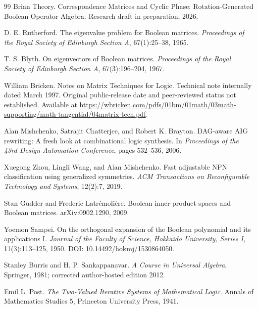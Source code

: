 \documentclass[11pt]{article}
\theoremstyle{definition}
\theoremstyle{remark}
\begin{document}
\begin{thebibliography}{99}
Brian Theory.
\newblock Correspondence Matrices and Cyclic Phase: Rotation-Generated Boolean Operator Algebra.
\newblock Research draft in preparation, 2026.

D. E. Rutherford.
\newblock The eigenvalue problem for Boolean matrices.
\newblock \emph{Proceedings of the Royal Society of Edinburgh Section A}, 67(1):25--38, 1965.

T. S. Blyth.
\newblock On eigenvectors of Boolean matrices.
\newblock \emph{Proceedings of the Royal Society of Edinburgh Section A}, 67(3):196--204, 1967.

William Bricken.
\newblock Notes on Matrix Techniques for Logic.
\newblock Technical note internally dated March 1997.  Original public-release date and peer-reviewed status not established. Available at \url{https://wbricken.com/pdfs/01bm/01math/03math-supporting/math-tangential/04matrix-tech.pdf}.

Alan Mishchenko, Satrajit Chatterjee, and Robert K. Brayton.
\newblock DAG-aware AIG rewriting: A fresh look at combinational logic synthesis.
\newblock In \emph{Proceedings of the 43rd Design Automation Conference}, pages 532--536, 2006.

Xuegong Zhou, Lingli Wang, and Alan Mishchenko.
\newblock Fast adjustable NPN classification using generalized symmetries.
\newblock \emph{ACM Transactions on Reconfigurable Technology and Systems}, 12(2):7, 2019.

Stan Gudder and Frederic Latr\'emoli\`ere.
\newblock Boolean inner-product spaces and Boolean matrices.
\newblock arXiv:0902.1290, 2009.

Yoemon Sampei.
\newblock On the orthogonal expansion of the Boolean polynomial and its applications I.
\newblock \emph{Journal of the Faculty of Science, Hokkaido University, Series I}, 11(3):113--125, 1950.
\newblock DOI: 10.14492/hokmj/1530864050.

Stanley Burris and H. P. Sankappanavar.
\newblock \emph{A Course in Universal Algebra}.
\newblock Springer, 1981; corrected author-hosted edition 2012.

Emil L. Post.
\newblock \emph{The Two-Valued Iterative Systems of Mathematical Logic}.
\newblock Annals of Mathematics Studies 5, Princeton University Press, 1941.

\end{thebibliography}
\end{document}
